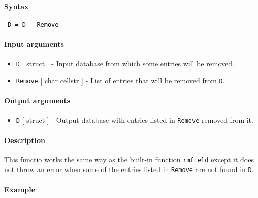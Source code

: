 


	\paragraph{Syntax}
 
 \begin{verbatim}
 D = D - Remove
 \end{verbatim}
 
 \paragraph{Input arguments}
 
 \begin{itemize}
 \item
   \texttt{D} {[} struct {]} - Input database from which some entries
   will be removed.
 \item
   \texttt{Remove} {[} char \textbar{} cellstr {]} - List of entries that
   will be removed from \texttt{D}.
 \end{itemize}
 
 \paragraph{Output arguments}
 
 \begin{itemize}
 \item
   \texttt{D} {[} struct {]} - Output database with entries listed in
   \texttt{Remove} removed from it.
 \end{itemize}
 
 \paragraph{Description}
 
 This functio works the same way as the built-in function
 \texttt{rmfield} except it does not throw an error when some of the
 entries listed in \texttt{Remove} are not found in \texttt{D}.
 
 \paragraph{Example}


